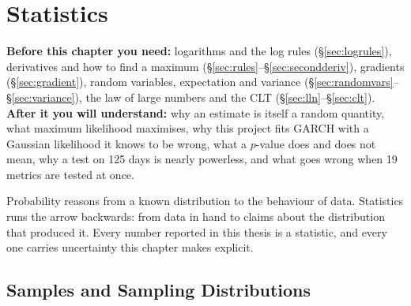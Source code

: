 \chapter{Statistics}
\label{ch:statistics}

\begin{tcolorbox}[feynbox={Sky}{BBg},title={Before and After}]
\textbf{Before this chapter you need:} logarithms and the log rules
(\S\ref{sec:logrules}), derivatives and how to find a maximum
(\S\ref{sec:rules}--\S\ref{sec:secondderiv}), gradients (\S\ref{sec:gradient}),
random variables, expectation and variance
(\S\ref{sec:randomvars}--\S\ref{sec:variance}), the law of large numbers and the
CLT (\S\ref{sec:lln}--\S\ref{sec:clt}).\\
\textbf{After it you will understand:} why an estimate is itself a random
quantity, what maximum likelihood maximises, why this project fits GARCH with a
Gaussian likelihood it knows to be wrong, what a $p$-value does and does not
mean, why a test on 125 days is nearly powerless, and what goes wrong when 19
metrics are tested at once.
\end{tcolorbox}

Probability reasons from a known distribution to the behaviour of data.
Statistics runs the arrow backwards: from data in hand to claims about the
distribution that produced it. Every number reported in this thesis is a
statistic, and every one carries uncertainty this chapter makes explicit.

\section{Samples and Sampling Distributions}
\label{sec:sampling}



